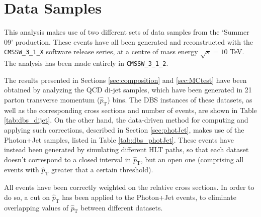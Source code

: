 \documentclass{cmspaper}
\begin{document}
\section{Data Samples}

This analysis makes use of two different sets of data samples from the `Summer 09' production. These events have all been generated and reconstructed with the {\tt CMSSW\_3\_1\_X} software release series, at a centre of mass energy $\sqrt{s} = 10$ TeV. The analysis has been made entirely in {\tt CMSSW\_3\_1\_2}.

The results presented in Sections \ref{sec:composition} and \ref{sec:MCtest} have been obtained by analyzing the  QCD di-jet samples, which have been generated in 21 parton transverse momentum ($\hat{p}_{\mathrm{T}}$) bins. The DBS instances of these datasets, as well as the corresponding cross sections and number of events, are shown in Table \ref{tab:dbs_dijet}. On the other hand, the data-driven method for computing and applying such corrections, described in Section \ref{sec:photJet}, makes use of the Photon+Jet samples, listed in Table \ref{tab:dbs_photJet}. These events have instead been generated by simulating different HLT paths, so that each dataset doesn't correspond to a closed interval in $\hat{p}_{\mathrm{T}}$, but an open one (comprising all events with $\hat{p}_{\mathrm{T}}$ greater that a certain threshold).

All events have been correctly weighted on the relative cross sections. In order to do so, a cut on $\hat{p}_{\mathrm{T}}$ has been applied to the Photon+Jet events, to eliminate overlapping values of $\hat{p}_{\mathrm{T}}$ between different datasets.
\end{document}
